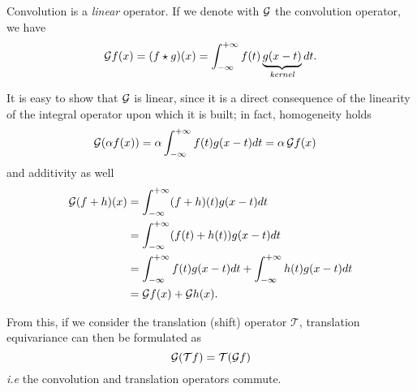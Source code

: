 

Convolution is a \emph{linear} operator. If we denote with ${\cal G}$ the convolution operator, we have 
\[
    {\cal G} f(x) = (f\star g)(x) = \int_{-\infty}^{+\infty} f(t) \underbrace{g(x-t)}_{\emph{\textrm{kernel}}} dt.
\]

It is easy to show that ${\cal G}$ is linear, since it is a direct consequence of the linearity of the integral operator upon which it is built;
in fact, homogeneity holds
\begin{align}
    {\cal G} (\alpha f(x)) &= \alpha \int_{-\infty}^{+\infty} f(t) g(x-t) dt  =\alpha \, {\cal G} f(x) 
\end{align}
and additivity as well
\begin{align}
    {\cal G}(f+h)(x) &= 
    \int_{-\infty}^{+\infty} (f+h)(t) g(x-t) dt \\
    & = \int_{-\infty}^{+\infty} (f(t)+h(t)) g(x-t)dt \\
    & =\int_{-\infty}^{+\infty} f(t) g(x-t) dt  + \int_{-\infty}^{+\infty} h(t) g(x-t) dt\\ 
    &= {\cal G} f(x) + {\cal G} h(x).
\end{align}

From this, if we consider the translation (shift) operator $\mathcal{T}$, translation equivariance can then be formulated as
\begin{equation}
    {\cal G}( \mathcal{T} f ) = \mathcal{T} ( {\cal G} f)
\end{equation}
\textit{i.e} the convolution and translation operators commute.